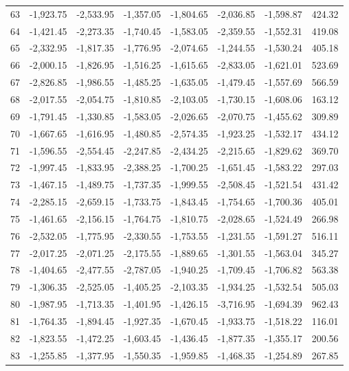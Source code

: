 \begin{longtable}{rrrrrrrr}
63 & -1,923.75 & -2,533.95 & -1,357.05 & -1,804.65 & -2,036.85 & -1,598.87 & 424.32  \\
64 & -1,421.45 & -2,273.35 & -1,740.45 & -1,583.05 & -2,359.55 & -1,552.31 & 419.08  \\
65 & -2,332.95 & -1,817.35 & -1,776.95 & -2,074.65 & -1,244.55 & -1,530.24 & 405.18  \\
66 & -2,000.15 & -1,826.95 & -1,516.25 & -1,615.65 & -2,833.05 & -1,621.01 & 523.69  \\
67 & -2,826.85 & -1,986.55 & -1,485.25 & -1,635.05 & -1,479.45 & -1,557.69 & 566.59  \\
68 & -2,017.55 & -2,054.75 & -1,810.85 & -2,103.05 & -1,730.15 & -1,608.06 & 163.12  \\
69 & -1,791.45 & -1,330.85 & -1,583.05 & -2,026.65 & -2,070.75 & -1,455.62 & 309.89  \\
70 & -1,667.65 & -1,616.95 & -1,480.85 & -2,574.35 & -1,923.25 & -1,532.17 & 434.12  \\
71 & -1,596.55 & -2,554.45 & -2,247.85 & -2,434.25 & -2,215.65 & -1,829.62 & 369.70  \\
72 & -1,997.45 & -1,833.95 & -2,388.25 & -1,700.25 & -1,651.45 & -1,583.22 & 297.03  \\
73 & -1,467.15 & -1,489.75 & -1,737.35 & -1,999.55 & -2,508.45 & -1,521.54 & 431.42  \\
74 & -2,285.15 & -2,659.15 & -1,733.75 & -1,843.45 & -1,754.65 & -1,700.36 & 405.01  \\
75 & -1,461.65 & -2,156.15 & -1,764.75 & -1,810.75 & -2,028.65 & -1,524.49 & 266.98  \\
76 & -2,532.05 & -1,775.95 & -2,330.55 & -1,753.55 & -1,231.55 & -1,591.27 & 516.11  \\
77 & -2,017.25 & -2,071.25 & -2,175.55 & -1,889.65 & -1,301.55 & -1,563.04 & 345.27  \\
78 & -1,404.65 & -2,477.55 & -2,787.05 & -1,940.25 & -1,709.45 & -1,706.82 & 563.38  \\
79 & -1,306.35 & -2,525.05 & -1,405.25 & -2,103.35 & -1,934.25 & -1,532.54 & 505.03  \\
80 & -1,987.95 & -1,713.35 & -1,401.95 & -1,426.15 & -3,716.95 & -1,694.39 & 962.43  \\
81 & -1,764.35 & -1,894.45 & -1,927.35 & -1,670.45 & -1,933.75 & -1,518.22 & 116.01  \\
82 & -1,823.55 & -1,472.25 & -1,603.45 & -1,436.45 & -1,877.35 & -1,355.17 & 200.56  \\
83 & -1,255.85 & -1,377.95 & -1,550.35 & -1,959.85 & -1,468.35 & -1,254.89 & 267.85  \\

\end{longtable}
